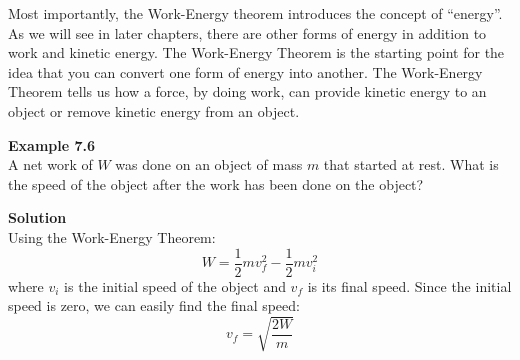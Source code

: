 Most importantly, the Work-Energy theorem introduces the concept of ``energy''. As we will see in later chapters, there are other forms of energy in addition to work and kinetic energy. The Work-Energy Theorem is the starting point for the idea that you can convert one form of energy into another. The Work-Energy Theorem tells us how a force, by doing work, can provide kinetic energy to an object or remove kinetic energy from an object.

\begin{framed}
\textbf{Example 7.6}\\
A net work of $W$ was done on an object of mass $m$ that started at rest. What is the speed of the object after the work has been done on the object?

\begin{framed}
\textbf{Solution}\\
Using the Work-Energy Theorem:
\begin{equation}
W = \frac{1}{2}mv_f^2 - \frac{1}{2}mv_i^2
\end{equation}
where $v_i$ is the initial speed of the object and $v_f$ is its final speed. Since the initial speed is zero, we can easily find the final speed:
\begin{equation}
v_f = \sqrt{\frac{2W}{m}}
\end{equation}
\end{framed}
\end{framed}

